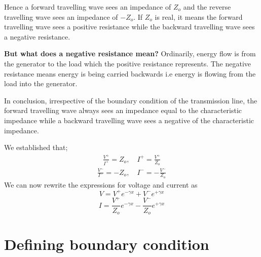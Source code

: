 Hence a forward travelling wave sees an impedance of $Z_o$ and the reverse travelling wave sees an impedance of $-Z_o$. If $Z_o$ is real, it means the forward travelling wave sees a positive resistance while the backward travelling wave sees a negative resistance.

\textbf{But what does a negative resistance mean?}
Ordinarily, energy flow is from the generator to the load which the positive resistance represents. The negative resistance means energy is being carried backwards i.e energy is flowing from the load into the generator.

In conclusion, irrespective of the boundary condition of the transmission line, the forward travelling wave always sees an impedance equal to the characteristic impedance while a backward travelling wave sees a negative of the characteristic impedance.

We established that;
\begin{align*}
\frac{V^+}{I^+} = Z_o,\quad I^+ = \frac{V^+}{Z_o}
\end{align*}
\begin{align*}
\frac{V^-}{I^-} = -Z_o,\quad I^- = -\frac{V^-}{Z_o}
\end{align*}
We can now rewrite the expressions for voltage and current as
\begin{equation}
V = V^+e^{-\gamma x}+V^-e^{+\gamma x}
\label{eqn:voltage}
\end{equation}
\begin{equation}
I = \frac{V^+}{Z_o}e^{-\gamma x}-\frac{V^-}{Z_o}e^{+\gamma x}
\label{eqn:current}
\end{equation}

\section{Defining boundary condition}

